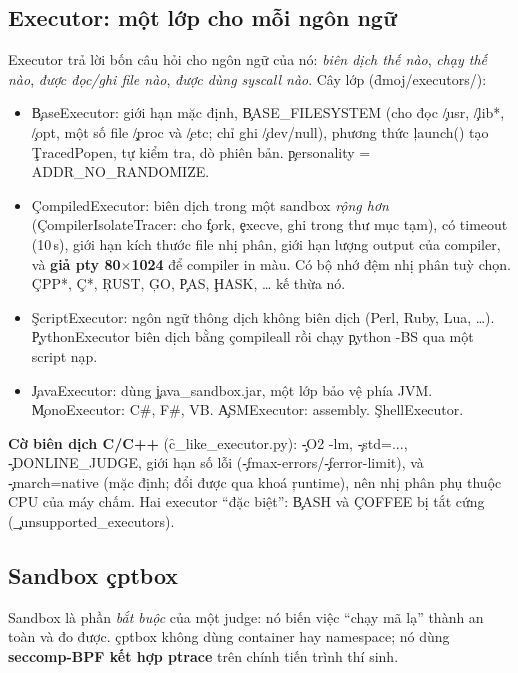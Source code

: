 \subsection{Executor: một lớp cho mỗi ngôn ngữ}
Executor trả lời bốn câu hỏi cho ngôn ngữ của nó: \emph{biên dịch thế nào}, \emph{chạy thế nào}, \emph{được đọc/ghi file nào}, \emph{được dùng syscall nào}. Cây lớp (\f{dmoj/executors/}):
\begin{itemize}
\item \c{BaseExecutor}: giới hạn mặc định, \c{BASE_FILESYSTEM} (cho đọc \c{/usr}, \c{/lib*}, \c{/opt}, một số file \c{/proc} và \c{/etc}; chỉ ghi \c{/dev/null}), phương thức \c{launch()} tạo \c{TracedPopen}, tự kiểm tra, dò phiên bản. \c{personality = ADDR_NO_RANDOMIZE}. \tS
\item \c{CompiledExecutor}: biên dịch trong một sandbox \emph{rộng hơn} (\mbox{\c{CompilerIsolateTracer}}: cho \c{fork}, \c{execve}, ghi trong thư mục tạm), có timeout (10\,s), giới hạn kích thước file nhị phân, giới hạn lượng output của compiler, và \textbf{giả pty 80$\times$1024} để compiler in màu. Có bộ nhớ đệm nhị phân tuỳ chọn. \c{CPP*}, \c{C*}, \c{RUST}, \c{GO}, \c{PAS}, \c{HASK}, \ldots{} kế thừa nó. \tS
\item \c{ScriptExecutor}: ngôn ngữ thông dịch không biên dịch (Perl, Ruby, Lua, \ldots). \c{PythonExecutor} biên dịch bằng \c{compileall} rồi chạy \c{python -BS} qua một script nạp.
\item \c{JavaExecutor}: dùng \c{java_sandbox.jar}, một lớp bảo vệ phía JVM. \c{MonoExecutor}: C\#, F\#, VB. \c{ASMExecutor}: assembly. \c{ShellExecutor}.
\end{itemize}
\textbf{Cờ biên dịch C/C++} (\f{c_like_executor.py}): \c{-O2 -lm}, \c{-std=...}, \c{-DONLINE_JUDGE}, giới hạn số lỗi (\c{-fmax-errors}/\c{-ferror-limit}), và \c{-march=native} (mặc định; đổi được qua khoá \c{runtime}), nên nhị phân phụ thuộc CPU của máy chấm. Hai executor ``đặc biệt'': \c{BASH} và \c{COFFEE} bị tắt cứng (\c{_unsupported_executors}). \tS

\subsection{Sandbox \texorpdfstring{\c{cptbox}}{cptbox}}\label{sec:cptbox}
Sandbox là phần \emph{bắt buộc} của một judge: nó biến việc ``chạy mã lạ'' thành an toàn và đo được. \c{cptbox} không dùng container hay namespace; nó dùng \textbf{seccomp-BPF kết hợp ptrace} trên chính tiến trình thí sinh.

